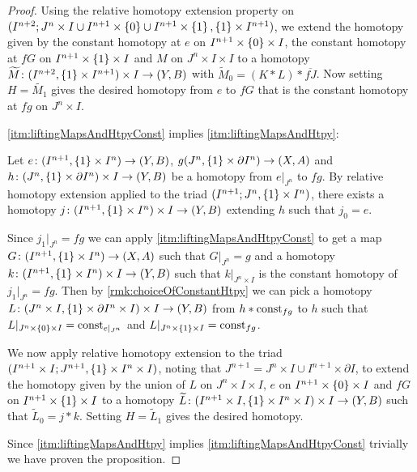\begin{prop}
\begin{proof}
        Using the relative homotopy extension property on $(I^{n+2};J^n\times I\cup I^{n+1}\times\left\lbrace0\right\rbrace\cup I^{n+1}\times\left\lbrace1\right\rbrace,\left\lbrace1\right\rbrace\times I^{n+1})$, we extend the homotopy given by the constant homotopy at $e$ on $I^{n+1}\times\left\lbrace0\right\rbrace\times I$, the constant homotopy at $fG$ on $I^{n+1}\times\left\lbrace1\right\rbrace\times I$ and $M$ on $J^n\times I\times I$ to a homotopy $\widetilde{M}\colon(I^{n+2},\left\lbrace1\right\rbrace\times I^{n+1})\times I\to(Y,B)$ with $\widetilde{M}_0=(K*L)*\overline{fJ}$.
        Now setting $H=\widetilde{M_1}$ gives the desired homotopy from $e$ to $fG$ that is the constant homotopy at $fg$ on $J^n\times I$.
        
        \ref{itm:liftingMapsAndHtpyConst} implies \ref{itm:liftingMapsAndHtpy}:

        Let $e\colon(I^{n+1},\left\lbrace1\right\rbrace\times I^n)\to (Y,B)$, $g(J^n,\left\lbrace1\right\rbrace\times\partial I^n)\to(X,A)$ and $h\colon(J^n,\left\lbrace1\right\rbrace\times\partial I^n)\times I\to(Y,B)$ be a homotopy from $e|_{J^n}$ to $fg$.
        By relative homotopy extension applied to the triad $(I^{n+1};J^n,\left\lbrace1\right\rbrace\times I^n)$, there exists a homotopy $j\colon(I^{n+1},\left\lbrace1\right\rbrace\times I^n)\times I\to(Y,B)$ extending $h$ such that $j_0=e$.
        
        Since $j_1|_{J^n}=fg$ we can apply \ref{itm:liftingMapsAndHtpyConst} to get a map $G\colon(I^{n+1},\left\lbrace1\right\rbrace\times I^n)\to(X,A)$ such that $G|_{J^n}=g$ and a homotopy $k\colon(I^{n+1},\left\lbrace1\right\rbrace\times I^n)\times I\to(Y,B)$ such that $k|_{J^n\times I}$ is the constant homotopy of $j_1|_{J^n}=fg$. 
        Then by \cref{rmk:choiceOfConstantHtpy} we can pick a homotopy $L\colon(J^n\times I,\left\lbrace1\right\rbrace\times\partial I^n\times I)\times I\to (Y,B)$ from $h*\operatorname{const}_{fg}$ to $h$ such that $L|_{J^n\times\left\lbrace0\right\rbrace\times I}=\operatorname{const}_{e|_{J^n}}$ and $L|_{J^n\times\left\lbrace1\right\rbrace\times I}=\operatorname{const}_{fg}$.
        
        We now apply relative homotopy extension to the triad $(I^{n+1}\times I;J^{n+1},\left\lbrace1\right\rbrace\times I^n\times I)$, noting that $J^{n+1}=J^n\times I\cup I^{n+1}\times\partial I$, to extend the homotopy given by the union of $L$ on $J^n\times I\times I$, $e$ on $I^{n+1}\times\left\lbrace0\right\rbrace\times I$ and $fG$ on $I^{n+1}\times\left\lbrace1\right\rbrace\times I$ to a homotopy $\widetilde{L}\colon(I^{n+1}\times I,\left\lbrace1\right\rbrace\times I^n\times I)\times I\to(Y,B)$ such that $\widetilde{L}_0=j*k$.
        Setting $H=\widetilde{L}_1$ gives the desired homotopy.


        Since \ref{itm:liftingMapsAndHtpy} implies \ref{itm:liftingMapsAndHtpyConst} trivially we have proven the proposition.
    \end{proof}
\end{prop}

